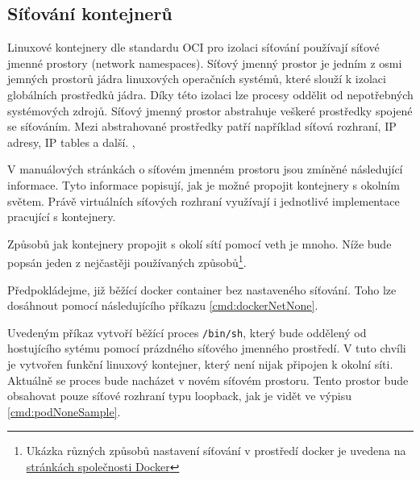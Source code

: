 \subsection{Síťování kontejnerů}\label{sitovaniKon}
Linuxové kontejnery dle standardu OCI pro izolaci síťování používají síťové jmenné prostory (network namespaces).
Síťový jmenný prostor je jedním z osmi jemných prostorů jádra linuxových operačních systémů, které slouží k izolaci globálních prostředků jádra. Díky této izolaci lze procesy oddělit od nepotřebných systémových zdrojů. Síťový jmenný prostor abstrahuje veškeré prostředky spojené se síťováním. Mezi abstrahované prostředky patří například síťová rozhraní, IP adresy, IP tables a další. \cite{thelinuxmanpagesproject_2022_namespaces7}, \cite{thelinuxmanpagesproject_2022_network_namespaces7}

V manuálových stránkách o síťovém jmenném prostoru jsou zmíněné následující informace. \textit{} \textit{} \cite{thelinuxmanpagesproject_2022_network_namespaces7} Tyto informace popisují, jak je možné propojit kontejnery s okolním světem. Právě virtuálních síťových rozhraní využívají i jednotlivé implementace pracující s kontejnery.    

Způsobů jak kontejnery propojit s okolí sítí pomocí veth je mnoho. Níže bude popsán jeden z nejčastěji používaných způsobů\footnote{Ukázka různých způsobů nastavení síťování v prostředí docker je uvedena na \href{https://docs.docker.com/network/}{stránkách společnosti Docker}}.

Předpokládejme, již běžící docker container bez nastaveného síťování. Toho lze dosáhnout pomocí následujícího příkazu \ref{cmd:dockerNetNone}.


Uvedeným příkaz vytvoří běžící proces \verb|/bin/sh|, který bude oddělený od hostujícího sytému pomocí prázdného síťového jmenného prostředí. V tuto chvíli je vytvořen funkční linuxový kontejner, který není nijak připojen k okolní síti. Aktuálně se proces bude nacházet v novém síťovém prostoru. Tento prostor bude obsahovat pouze síťové rozhraní typu loopback, jak je vidět ve výpisu \ref{cmd:podNoneSample}. 



